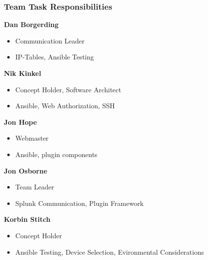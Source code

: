 \begin{frame}
\frametitle{Team Task Responsibilities}

\textbf{Dan Borgerding}
\begin{itemize}
\item Communication Leader
\item IP-Tables, Ansible Testing\end{itemize}

\textbf{Nik Kinkel}
\begin{itemize}
\item Concept Holder, Software Architect
\item Ansible, Web Authorization, SSH \end{itemize}


\textbf{Jon Hope}
\begin{itemize}
\item Webmaster
\item Ansible, plugin components
\end{itemize}

\textbf{Jon Osborne}
\begin{itemize}
\item Team Leader
\item Splunk Communication, Plugin Framework
\end{itemize}

\textbf{Korbin Stitch}
\begin{itemize}
\item Concept Holder
\item  Ansible Testing, Device Selection, Evironmental Considerations
\end{itemize}



\end{frame}


